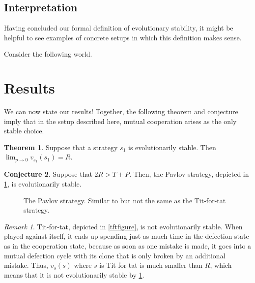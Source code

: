 \documentclass[11pt]{amsart}
\theoremstyle{definition}
\newtheorem{theorem}{Theorem}[section]
\newtheorem{conjecture}[theorem]{Conjecture}
\theoremstyle{remark}
\newtheorem*{remark}{Remark}
\begin{document}
\subsection{Interpretation}

Having concluded our formal definition of evolutionary stability, it might be helpful to see examples of concrete setups in which this definition makes sense.

Consider the following world. 



\section{Results}
\label{sectionresults}

We can now state our results! Together, the following theorem and conjecture imply that in the setup described here, mutual cooperation arises as the only stable choice.

\begin{theorem}
  \label{evolutionarystable1}
  Suppose that a strategy $s_1$ is evolutionarily stable. Then $\lim_{p \to 0} v_{s_1}(s_1) = R$.
\end{theorem}

\begin{conjecture}
  \label{pavlovtheorem}
  Suppose that $2R > T + P$. Then, the Pavlov strategy, depicted in \cref{pavlovfigure}, is evolutionarily stable.
\end{conjecture}

\begin{figure}
  \centering
  \caption{The Pavlov strategy. Similar to but not the same as the Tit-for-tat strategy.}
  \label{pavlovfigure}
\end{figure}


\begin{remark}
  Tit-for-tat, depicted in \cref{tftfigure}, is not evolutionarily stable. 
  When played against itself, it ends up spending just as much time in the defection state as in the cooperation state, because as soon as one mistake is made, it goes into a mutual defection cycle with its clone that is only broken by an additional mistake.
  Thus, $v_s(s)$ where $s$ is Tit-for-tat is much smaller than $R$, which means that it is not evolutionarily stable by \cref{evolutionarystable1}.
\end{remark}
\end{document}

